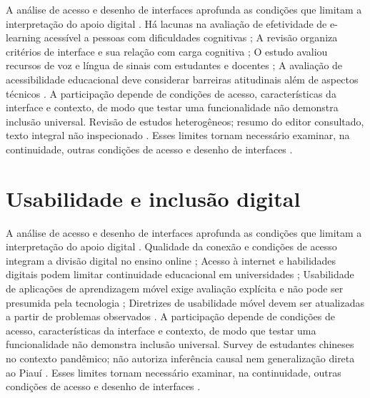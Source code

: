 A análise de acesso e desenho de interfaces aprofunda as condições que limitam a interpretação do apoio digital \citep{cinquin2019} \citep{cob2023} \citep{farhan2020} \citep{gobbo2023}. Há lacunas na avaliação de efetividade de e-learning acessível a pessoas com dificuldades cognitivas \citep{cinquin2019}; A revisão organiza critérios de interface e sua relação com carga cognitiva \citep{cob2023}; O estudo avaliou recursos de voz e língua de sinais com estudantes e docentes \citep{farhan2020}; A avaliação de acessibilidade educacional deve considerar barreiras atitudinais além de aspectos técnicos \citep{gobbo2023}. A participação depende de condições de acesso, características da interface e contexto, de modo que testar uma funcionalidade não demonstra inclusão universal. Revisão de estudos heterogêneos; resumo do editor consultado, texto integral não inspecionado \citep{cinquin2019} \citep{cob2023} \citep{farhan2020} \citep{gobbo2023}. Esses limites tornam necessário examinar, na continuidade, outras condições de acesso e desenho de interfaces \citep{cinquin2019} \citep{cob2023} \citep{farhan2020} \citep{gobbo2023}.

\clearpage\section{Usabilidade e inclusão digital}

A análise de acesso e desenho de interfaces aprofunda as condições que limitam a interpretação do apoio digital \citep{guo2022} \citep{jamil2023} \citep{kumar2017} \citep{kumarguideline2019}. Qualidade da conexão e condições de acesso integram a divisão digital no ensino online \citep{guo2022}; Acesso à internet e habilidades digitais podem limitar continuidade educacional em universidades \citep{jamil2023}; Usabilidade de aplicações de aprendizagem móvel exige avaliação explícita e não pode ser presumida pela tecnologia \citep{kumar2017}; Diretrizes de usabilidade móvel devem ser atualizadas a partir de problemas observados \citep{kumarguideline2019}. A participação depende de condições de acesso, características da interface e contexto, de modo que testar uma funcionalidade não demonstra inclusão universal. Survey de estudantes chineses no contexto pandêmico; não autoriza inferência causal nem generalização direta ao Piauí \citep{guo2022} \citep{jamil2023} \citep{kumar2017} \citep{kumarguideline2019}. Esses limites tornam necessário examinar, na continuidade, outras condições de acesso e desenho de interfaces \citep{guo2022} \citep{jamil2023} \citep{kumar2017} \citep{kumarguideline2019}.

